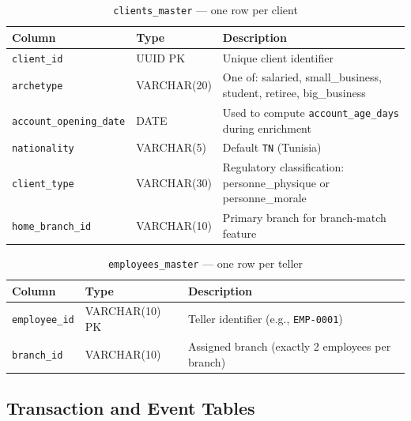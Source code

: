 \begin{table}[H]
\centering
\caption{\texttt{clients\_master} --- one row per client}
\label{tab:clients-master}
\begin{tabularx}{\textwidth}{@{}llX@{}}
\toprule
\textbf{Column} & \textbf{Type} & \textbf{Description} \\
\midrule
\texttt{client\_id}           & UUID PK      & Unique client identifier \\
\texttt{archetype}            & VARCHAR(20)  & One of: salaried, small\_business, student, retiree, big\_business \\
\texttt{account\_opening\_date} & DATE        & Used to compute \texttt{account\_age\_days} during enrichment \\
\texttt{nationality}          & VARCHAR(5)   & Default \texttt{TN} (Tunisia) \\
\texttt{client\_type}         & VARCHAR(30)  & Regulatory classification: personne\_physique or personne\_morale \\
\texttt{home\_branch\_id}     & VARCHAR(10)  & Primary branch for branch-match feature \\
\bottomrule
\end{tabularx}
\end{table}

\begin{table}[H]
\centering
\caption{\texttt{employees\_master} --- one row per teller}
\label{tab:employees-master}
\begin{tabularx}{\textwidth}{@{}llX@{}}
\toprule
\textbf{Column} & \textbf{Type} & \textbf{Description} \\
\midrule
\texttt{employee\_id} & VARCHAR(10) PK & Teller identifier (e.g., \texttt{EMP-0001}) \\
\texttt{branch\_id}   & VARCHAR(10)    & Assigned branch (exactly 2 employees per branch) \\
\bottomrule
\end{tabularx}
\end{table}

\subsection{Transaction and Event Tables}

